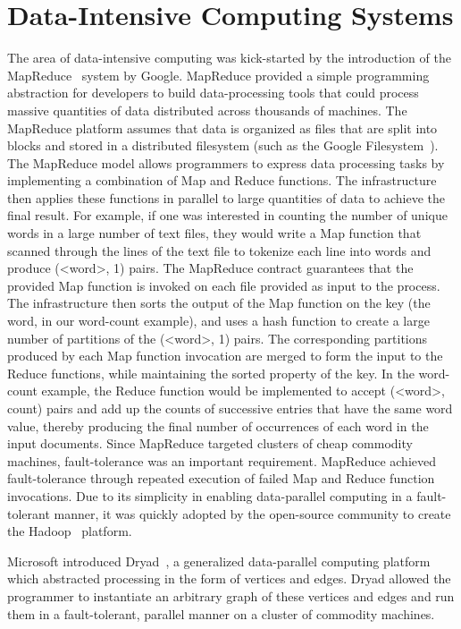 \section{Data-Intensive Computing Systems}

The area of data-intensive computing was kick-started by the introduction of the MapReduce~\cite{mapreduce} system by Google. MapReduce provided a simple programming abstraction for developers to build data-processing tools that could process massive quantities of data distributed across thousands of machines. The MapReduce platform assumes that data is organized as files that are split into blocks and stored in a distributed filesystem (such as the Google Filesystem~\cite{GFS-Paper}). The MapReduce model allows programmers to express data processing tasks by implementing a combination of Map and Reduce functions. The infrastructure then applies these functions in parallel to large quantities of data to achieve the final result. For example, if one was interested in counting the number of unique words in a large number of text files, they would write a Map function that scanned through the lines of the text file to tokenize each line into words and produce (<word>, 1) pairs. The MapReduce contract guarantees that the provided Map function is invoked on each file provided as input to the process. The infrastructure then sorts the output of the Map function on the key (the word, in our word-count example), and uses a hash function to create a large number of partitions of the (<word>, 1) pairs. The corresponding partitions produced by each Map function invocation are merged to form the input to the Reduce functions, while maintaining the sorted property of the key. In the word-count example, the Reduce function would be implemented to accept (<word>, count) pairs and add up the counts of successive entries that have the same word value, thereby producing the final number of occurrences of each word in the input documents. Since MapReduce targeted clusters of cheap commodity machines, fault-tolerance was an important requirement. MapReduce achieved fault-tolerance through repeated execution of failed Map and Reduce function invocations. Due to its simplicity in enabling data-parallel computing in a fault-tolerant manner, it was quickly adopted by the open-source community to create the Hadoop~\cite{hadoop} platform. 

Microsoft introduced Dryad~\cite{Isard:2007kx}, a generalized data-parallel computing platform which abstracted processing in the form of vertices and edges. Dryad allowed the programmer to instantiate an arbitrary graph of these vertices and edges and run them in a fault-tolerant, parallel manner on a cluster of commodity machines.

